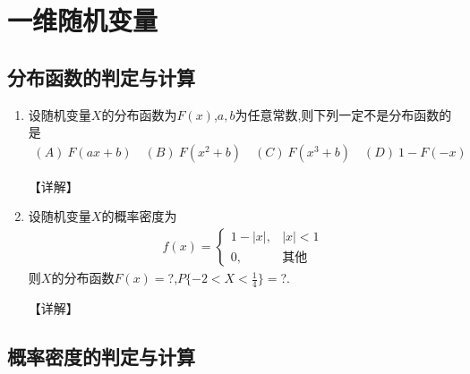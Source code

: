 \documentclass[12pt, a4paper, oneside, UTF8]{ctexbook}
\begin{document}
% 
\else
\fi

\chapter{一维随机变量}

\section{分布函数的判定与计算}

\begin{enumerate}[label=\arabic*.]
    \item 设随机变量$X$的分布函数为$F(x)$,$a,b$为任意常数,则下列一定不是分布函数的是
    \begin{align*}
        (A)\ F(ax+b) \quad (B)\ F(x^2+b) \quad (C)\ F(x^3+b) \quad (D)\ 1-F(-x)
    \end{align*}
    
    \begin{solution}
    【详解】
    \end{solution}
    
    \item 设随机变量$X$的概率密度为
    \begin{align*}
        f(x)=\begin{cases}
            1-|x|, & |x|<1 \\
            0, & \text{其他}
        \end{cases}
    \end{align*}
    则$X$的分布函数$F(x)=$?,$P\{-2<X<\frac{1}{4}\}=$?.
    
    \begin{solution}
    【详解】
    \end{solution}
\end{enumerate}

\section{概率密度的判定与计算}
\end{document}
